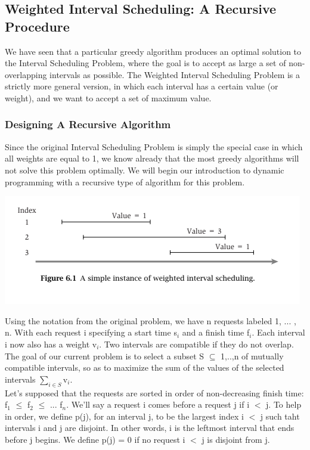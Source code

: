 \documentclass{article}
\begin{document}
\subsection{Weighted Interval Scheduling: A Recursive Procedure}
We have seen that a particular greedy algorithm produces an optimal solution to the Interval Scheduling Problem, where the goal is to accept as large a set of non-overlapping intervals as possible. The Weighted Interval Scheduling Problem is a strictly more general version, in which each interval has a certain value (or weight), and we want to accept a set of maximum value.\\

\subsubsection{Designing A Recursive Algorithm}
Since the original Interval Scheduling Problem is simply the special case in which all weights are equal to 1, we know already that the most greedy algorithms will not solve this problem optimally. We will begin our introduction to dynamic programming with a recursive type of algorithm for this problem.\\

\begin{center}
    \includegraphics[]{figures/fig5.png}
\end{center}

Using the notation from the original problem, we have n requests labeled 1, ... , n. With each request i specifying a start time s$_i$ and a finish time f$_i$. Each interval i now also has a weight v$_i$. Two intervals are compatible if they do not overlap. The goal of our current problem is to select a subset S $\subseteq$ {1,..,n} of mutually compatible intervals, so as to maximize the sum of the values of the selected intervals $\sum_{ i \in S  }^{}$v$_i$.\\

Let's supposed that the requests are sorted in order of non-decreasing finish time: f$_1$ $\le$ f$_2$ $\le$ ... f$_n$. We'll say a request i comes before a request j if i $<$ j. To help in order, we define p(j), for an interval j, to be the largest index i $<$ j such taht intervals i and j are disjoint. In other words, i is the leftmost interval that ends before j begins. We define p(j) = 0 if no request i $<$ j is disjoint from j.\\
\end{document}
